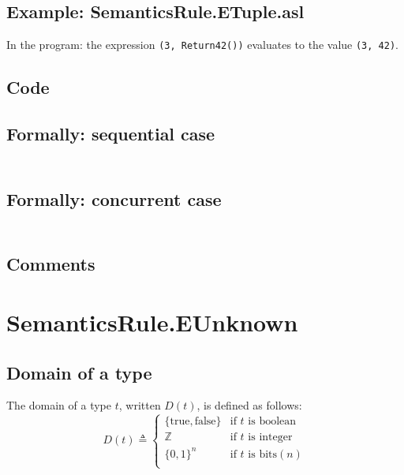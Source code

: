 \documentclass{book}
\begin{document}
  \subsection{Example: SemanticsRule.ETuple.asl}
    In the program:
    the expression \texttt{(3, Return42())} evaluates to the value \texttt{(3, 42)}.

  \subsection{Code}

  \subsection{Formally: sequential case}
  \begin{align}
  \end{align} 

  \subsection{Formally: concurrent case}
  \begin{align}
  \end{align} 

  \subsection{Comments}

\section{SemanticsRule.EUnknown \label{sec:SemanticsRule.EUnknown}}

  \subsection{Domain of a type}

  The domain of a type $t$, written $D(t)$, is defined as follows:
  \[
  D(t) \triangleq \left\{
    \begin{array}{ll}
      \{\text{true}, \text{false} \} & \text{if } t \text{ is boolean}  \\
      \mathbb{Z}                     & \text{if } t \text{ is integer}  \\
      {\{0, 1\}}^n                   & \text{if } t \text{ is bits} (n) \\
    \end{array}
  \right.
  \]
\end{document}
